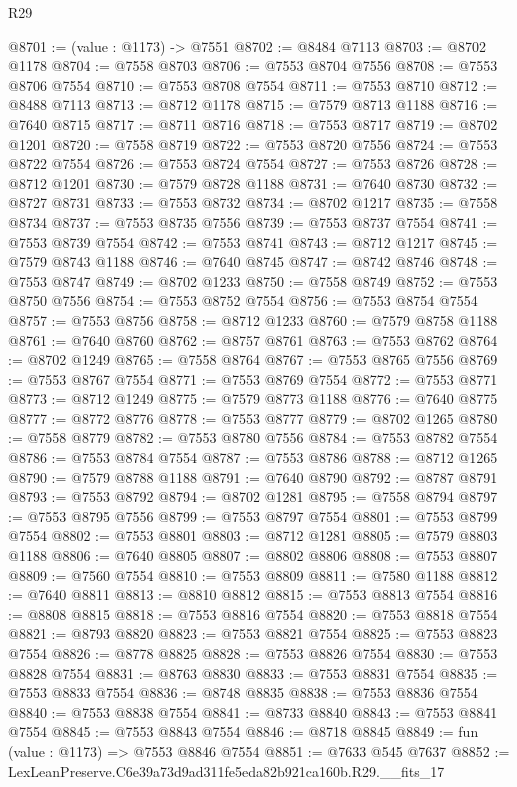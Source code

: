 \begin{lexlean}{R29}
\begin{coremodule}
@8701 := (value : @1173) -> @7551
@8702 := @8484 @7113
@8703 := @8702 @1178
@8704 := @7558 @8703
@8706 := @7553 @8704 @7556
@8708 := @7553 @8706 @7554
@8710 := @7553 @8708 @7554
@8711 := @7553 @8710
@8712 := @8488 @7113
@8713 := @8712 @1178
@8715 := @7579 @8713 @1188
@8716 := @7640 @8715
@8717 := @8711 @8716
@8718 := @7553 @8717
@8719 := @8702 @1201
@8720 := @7558 @8719
@8722 := @7553 @8720 @7556
@8724 := @7553 @8722 @7554
@8726 := @7553 @8724 @7554
@8727 := @7553 @8726
@8728 := @8712 @1201
@8730 := @7579 @8728 @1188
@8731 := @7640 @8730
@8732 := @8727 @8731
@8733 := @7553 @8732
@8734 := @8702 @1217
@8735 := @7558 @8734
@8737 := @7553 @8735 @7556
@8739 := @7553 @8737 @7554
@8741 := @7553 @8739 @7554
@8742 := @7553 @8741
@8743 := @8712 @1217
@8745 := @7579 @8743 @1188
@8746 := @7640 @8745
@8747 := @8742 @8746
@8748 := @7553 @8747
@8749 := @8702 @1233
@8750 := @7558 @8749
@8752 := @7553 @8750 @7556
@8754 := @7553 @8752 @7554
@8756 := @7553 @8754 @7554
@8757 := @7553 @8756
@8758 := @8712 @1233
@8760 := @7579 @8758 @1188
@8761 := @7640 @8760
@8762 := @8757 @8761
@8763 := @7553 @8762
@8764 := @8702 @1249
@8765 := @7558 @8764
@8767 := @7553 @8765 @7556
@8769 := @7553 @8767 @7554
@8771 := @7553 @8769 @7554
@8772 := @7553 @8771
@8773 := @8712 @1249
@8775 := @7579 @8773 @1188
@8776 := @7640 @8775
@8777 := @8772 @8776
@8778 := @7553 @8777
@8779 := @8702 @1265
@8780 := @7558 @8779
@8782 := @7553 @8780 @7556
@8784 := @7553 @8782 @7554
@8786 := @7553 @8784 @7554
@8787 := @7553 @8786
@8788 := @8712 @1265
@8790 := @7579 @8788 @1188
@8791 := @7640 @8790
@8792 := @8787 @8791
@8793 := @7553 @8792
@8794 := @8702 @1281
@8795 := @7558 @8794
@8797 := @7553 @8795 @7556
@8799 := @7553 @8797 @7554
@8801 := @7553 @8799 @7554
@8802 := @7553 @8801
@8803 := @8712 @1281
@8805 := @7579 @8803 @1188
@8806 := @7640 @8805
@8807 := @8802 @8806
@8808 := @7553 @8807
@8809 := @7560 @7554
@8810 := @7553 @8809
@8811 := @7580 @1188
@8812 := @7640 @8811
@8813 := @8810 @8812
@8815 := @7553 @8813 @7554
@8816 := @8808 @8815
@8818 := @7553 @8816 @7554
@8820 := @7553 @8818 @7554
@8821 := @8793 @8820
@8823 := @7553 @8821 @7554
@8825 := @7553 @8823 @7554
@8826 := @8778 @8825
@8828 := @7553 @8826 @7554
@8830 := @7553 @8828 @7554
@8831 := @8763 @8830
@8833 := @7553 @8831 @7554
@8835 := @7553 @8833 @7554
@8836 := @8748 @8835
@8838 := @7553 @8836 @7554
@8840 := @7553 @8838 @7554
@8841 := @8733 @8840
@8843 := @7553 @8841 @7554
@8845 := @7553 @8843 @7554
@8846 := @8718 @8845
@8849 := fun (value : @1173) => @7553 @8846 @7554
@8851 := @7633 @545 @7637
@8852 := LexLeanPreserve.C6e39a73d9ad311fe5eda82b921ca160b.R29.__fits_17

\end{coremodule}
\end{lexlean}
